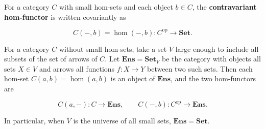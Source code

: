 For a category $C$ with small hom-sets and each object $b \in C$, the \textbf{contravariant hom-functor} is written covariantly as

$$
C(-, b) = \hom(-, b): C^{\text{op}} \to \mathbf{Set}.
$$

For a category $C$ without small hom-sets, take a set $V$ large enough to include all subsets of the set of arrows of $C$. Let $\mathbf{Ens} = \mathbf{Set}_V$ be the category with objects all sets $X \in V$ and arrows all functions $f: X \to Y$ between two such sets. Then each hom-set $C(a, b) = \hom(a, b)$ is an object of $\mathbf{Ens}$, and the two hom-functors are

$$
C(a, -): C \to \mathbf{Ens}, \qquad C(-, b): C^{\text{op}} \to \mathbf{Ens}. \tag{7}
$$

In particular, when $V$ is the universe of all small sets, $\mathbf{Ens} = \mathbf{Set}$.
